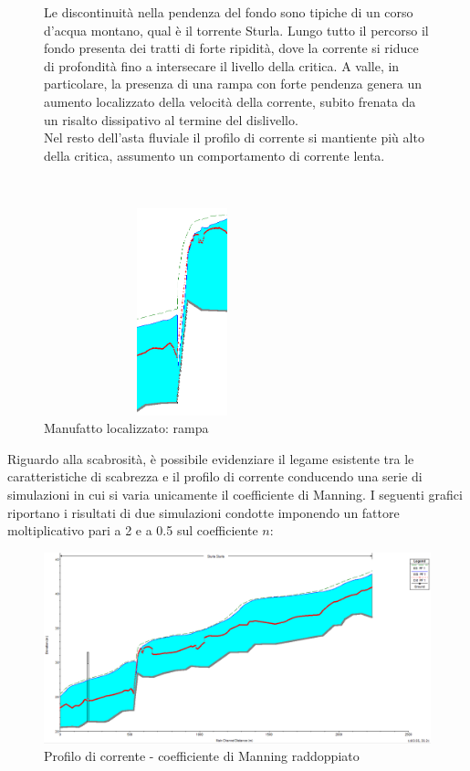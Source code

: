 \documentclass[12pt]{article} %
\begin{document}
\begin{figure}[H]
\begin{minipage}[b]{8.5cm}
\noindent Le discontinuità nella pendenza del fondo sono tipiche di un corso d'acqua montano, qual è il torrente Sturla. Lungo tutto il percorso il fondo presenta dei tratti di forte ripidità, dove la corrente si riduce di profondità fino a intersecare il livello della critica. A valle, in particolare, la presenza di una rampa con forte pendenza genera un aumento localizzato della velocità della corrente, subito frenata da un risalto dissipativo al termine del dislivello.\\
Nel resto dell'asta fluviale il profilo di corrente si mantiente più alto della critica, assumento un comportamento di corrente lenta.

\end{minipage}
\ \hspace{2mm} \hspace{3mm} \
\begin{minipage}[b]{8.5cm}
    \centering
    \includegraphics[height=6cm, width=8cm]{Risalto.PNG}
    \caption{Manufatto localizzato: rampa}
\end{minipage}
\end{figure}

\newpage

\noindent Riguardo alla scabrosità, è possibile evidenziare il legame esistente tra le caratteristiche di scabrezza e il profilo di corrente conducendo una serie di simulazioni in cui si varia unicamente il coefficiente di Manning.
I seguenti grafici riportano i risultati di due simulazioni condotte imponendo un fattore moltiplicativo pari a 2 e a 0.5 sul coefficiente $n$:

\begin{figure}[H]
    \centering
    \includegraphics[scale=0.45]{Manningx2.PNG}
    \caption{Profilo di corrente - coefficiente di Manning raddoppiato}
\end{figure}
\end{document}
